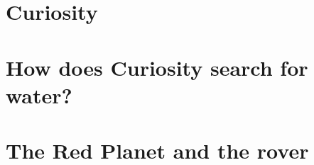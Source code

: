 \documentclass[DIV=calc, paper=a4, fontsize=12pt]{scrartcl}	 %
\begin{document}


\section{Curiosity}

\begin{multicols}{2}



\end{multicols}



\pagebreak

\section{How does Curiosity search for water?}

\begin{multicols}{2}













\end{multicols}

\noindent\makebox[\linewidth]{\rule{\textwidth}{0.4pt}}

\section{The Red Planet and the rover}

\begin{multicols}{2}



\end{multicols}
\end{document}
